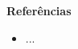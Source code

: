 \begin{frame}{\bf Referências }
\begin{itemize} \justifying
    \item ...
\end{itemize}

\end{frame}